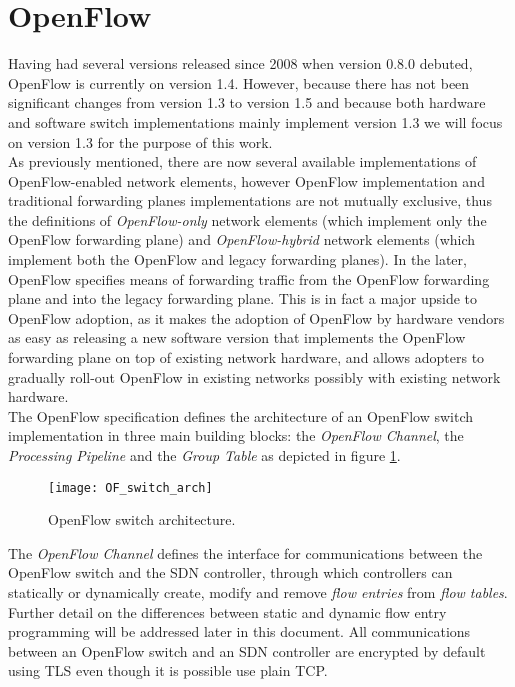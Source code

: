\section{OpenFlow}
\label{section:openflow}
Having had several versions released since 2008 when version 0.8.0 debuted, OpenFlow is currently on version 1.4.
However, because there has not been significant changes from version 1.3 to version 1.5 and because both hardware and software switch implementations mainly implement version 1.3 we will focus on version 1.3 for the purpose of this work.\\
%
As previously mentioned, there are now several available implementations of OpenFlow-enabled network elements, however OpenFlow implementation and traditional forwarding planes implementations are not mutually exclusive, thus the definitions of \emph{OpenFlow-only} network elements (which implement only the OpenFlow forwarding plane) and \emph{OpenFlow-hybrid} network elements (which implement both the OpenFlow and legacy forwarding planes).
In the later, OpenFlow specifies means of forwarding traffic from the OpenFlow forwarding plane and into the legacy forwarding plane\cite{OF13}.
This is in fact a major upside to OpenFlow adoption, as it makes the adoption of OpenFlow by hardware vendors as easy as releasing a new software version that implements the OpenFlow forwarding plane on top of existing network hardware, and allows adopters to gradually roll-out OpenFlow in existing networks possibly with existing network hardware.\\
%
The OpenFlow specification defines the architecture of an OpenFlow switch implementation in three main building blocks: the \emph{OpenFlow Channel}, the \emph{Processing Pipeline} and the \emph{Group Table} as depicted in figure \ref{fig:OF_switch_arch}.
\begin{figure}
	\centering
	\texttt{[image: OF\_switch\_arch]}
	\caption{OpenFlow switch architecture.}
	\label{fig:OF_switch_arch}
\end{figure}
The \emph{OpenFlow Channel} defines the interface for communications between the OpenFlow switch and the \gls{SDN} controller, through which controllers can statically or dynamically create, modify and remove \emph{flow entries} from \emph{flow tables}.
Further detail on the differences between static and dynamic flow entry programming will be addressed later in this document.
All communications between an OpenFlow switch and an \gls{SDN} controller are encrypted by default using \gls{TLS} even though it is possible use plain \gls{TCP}\cite{OF13}.
